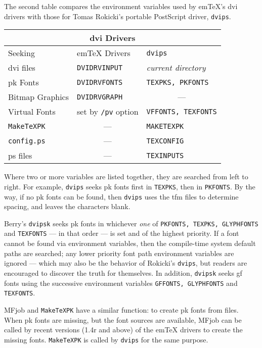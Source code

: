 The second table compares the environment variables used by em\TeX{}'s
{\sc dvi} drivers with those for Tomas {\sc Rokicki\/}'s portable
{\sf PostScript} driver, {\tt dvips}.

\begin{center}
\begin{tabular}{|l|l|l|}
  \hline
  \multicolumn{3}{|c|}{{\sc dvi} Drivers} \\
  \hline
  Seeking & em\TeX{} Drivers & {\tt dvips} \\
  \hline
  {\sc dvi} files & {\tt DVIDRVINPUT} & {\em current directory} \\
  {\sc pk} Fonts & {\tt DVIDRVFONTS} & {\tt TEXPKS, PKFONTS} \\
  Bitmap Graphics & {\tt DVIDRVGRAPH} & \multicolumn{1}{c|}{---} \\
  Virtual Fonts & set by {\tt /pv} option & {\tt VFFONTS, TEXFONTS} \\
  {\tt MakeTeXPK} & \multicolumn{1}{c|}{---} & {\tt MAKETEXPK} \\
  {\tt config.ps} & \multicolumn{1}{c|}{---} & {\tt TEXCONFIG} \\
  {\sc ps} files & \multicolumn{1}{c|}{---} & {\tt TEXINPUTS} \\
  \hline
\end{tabular}
\end{center}

Where two or more variables are listed together, they are
searched from left to right.  For example, {\tt dvips} seeks {\sc pk}
fonts first in {\tt TEXPKS}, then in {\tt PKFONTS}.
By the way, if no {\sc pk} fonts can be found, then {\tt dvips}
uses the {\sc tfm} files to determine spacing, and leaves the
characters blank.

{\sc Berry}'s {\tt dvipsk} seeks {\sc pk} fonts in whichever
{\em one\/} of {\tt PKFONTS, TEXPKS, GLYPHFONTS} and {\tt TEXFONTS}
--- in that order --- is set and of the highest priority.
If a font cannot be found via environment variables, then the
compile-time system default paths are searched; any lower priority
font path environment variables are ignored --- which may also be the
behavior of Rokicki's {\tt dvips}, but readers are encouraged to
discover the truth for themselves.
In addition, {\tt dvipsk} seeks {\sc gf} fonts using the successive
environment variables {\tt GFFONTS, GLYPHFONTS} and {\tt TEXFONTS}.

{\sf MFjob} and {\tt MakeTeXPK} have a similar function:
to create {\sc pk} fonts from \MF{} files.
When {\sc pk} fonts are missing, but the \MF{} font sources
are available,
{\sf MFjob} can be called by recent versions (1.4r and above)
of the em\TeX{} drivers to create the missing fonts.
{\tt MakeTeXPK} is called by {\tt dvips} for the same purpose.

